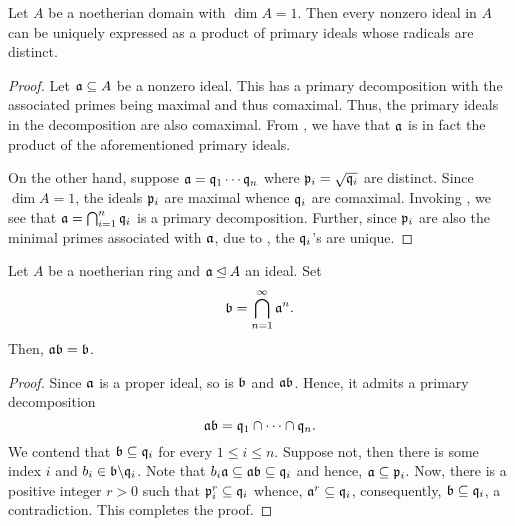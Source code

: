 \begin{lemma}
    Let $A$ be a noetherian domain with $\dim A = 1$. Then every nonzero ideal in $A$ can be uniquely expressed as a product of primary ideals whose radicals are distinct.
\end{lemma}
\begin{proof}
    Let $\mathfrak a\subseteq A$ be a nonzero ideal. This has a primary decomposition with the associated primes being maximal and thus comaximal. Thus, the primary ideals in the decomposition are also comaximal. From , we have that $\mathfrak a$ is in fact the product of the aforementioned primary ideals.

    On the other hand, suppose $\mathfrak a = \mathfrak q_1\cdots\mathfrak q_n$ where $\mathfrak p_i = \sqrt{\mathfrak q_i}$ are distinct. Since $\dim A = 1$, the ideals $\mathfrak p_i$ are maximal whence $\mathfrak q_i$ are comaximal. Invoking , we see that $\mathfrak a = \bigcap_{i = 1}^n\mathfrak q_i$ is a primary decomposition. Further, since $\mathfrak p_i$ are also the minimal primes associated with $\mathfrak a$, due to , the $\mathfrak q_i$'s are unique.
\end{proof}

\begin{theorem}
    Let $A$ be a noetherian ring and $\mathfrak a\unlhd A$ an ideal. Set 
    \begin{equation*}
        \mathfrak b = \bigcap_{n = 1}^\infty\mathfrak a^n.
    \end{equation*}
    Then, $\mathfrak a\mathfrak b = \mathfrak b$.
\end{theorem}
\begin{proof}
    Since $\mathfrak a$ is a proper ideal, so is $\mathfrak b$ and $\mathfrak a\mathfrak b$. Hence, it admits a primary decomposition 
    \begin{equation*}
        \mathfrak a\mathfrak b = \mathfrak q_1\cap\dots\cap\mathfrak q_n.
    \end{equation*}
    We contend that $\mathfrak b\subseteq\mathfrak q_i$ for every $1\le i\le n$. Suppose not, then there is some index $i$ and $b_i\in\mathfrak b\backslash\mathfrak q_i$. Note that $b_i\mathfrak a\subseteq\mathfrak a\mathfrak b\subseteq\mathfrak q_i$ and hence, $\mathfrak a\subseteq\mathfrak p_i$. Now, there is a positive integer $r > 0$ such that $\mathfrak p_i^r\subseteq\mathfrak q_i$ whence, $\mathfrak a^r\subseteq\mathfrak q_i$, consequently, $\mathfrak b\subseteq\mathfrak q_i$, a contradiction. This completes the proof.
\end{proof}

